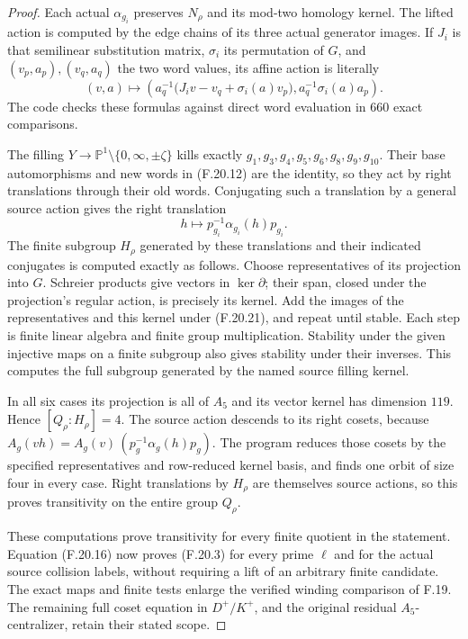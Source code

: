 \begin{proof}
Each actual $\alpha_{g_i}$ preserves $N_\rho$
and its mod-two homology kernel.
The lifted action is computed by the edge
chains of its three actual generator images.
If $J_i$ is that semilinear substitution matrix,
$\sigma_i$ its permutation of $G$, and
$(v_p,a_p),(v_q,a_q)$ the two word values,
its affine action is literally
\[
 (v,a)\longmapsto
 \left(a_q^{-1}\bigl(J_i v-v_q+\sigma_i(a)v_p\bigr),
                         a_q^{-1}\sigma_i(a)a_p\right).
                                                               \tag{F.20.20}
\]
The code checks these formulas against direct
word evaluation in $660$ exact comparisons.

The filling $Y\to
\mathbb P^1\setminus\{0,\infty,\pm\zeta\}$
kills exactly $g_1,g_3,g_4,g_5,g_6,g_8,g_9,g_{10}$.
Their base automorphisms and new words in
(F.20.12) are the identity, so they act by
right translations through their old words.
Conjugating such a translation by a general
source action gives the right translation
\[
                         h\longmapsto
                  p_{g_i}^{-1}\alpha_{g_i}(h)p_{g_i}.
                                                               \tag{F.20.21}
\]
The finite subgroup $H_\rho$ generated by these
translations and their indicated conjugates is
computed exactly as follows. Choose representatives
of its projection into $G$. Schreier products
give vectors in $\ker\partial$; their span,
closed under the projection's regular action,
is precisely its kernel. Add the images of
the representatives and this kernel under
(F.20.21), and repeat until stable.
Each step is finite linear algebra and finite
group multiplication. Stability under the
given injective maps on a finite subgroup
also gives stability under their inverses.
This computes the full subgroup generated
by the named source filling kernel.

In all six cases its projection is all of
$A_5$ and its vector kernel has dimension
$119$. Hence $[Q_\rho:H_\rho]=4$.
The source action descends to its right
cosets, because
$A_g(vh)=A_g(v)\,
 (p_g^{-1}\alpha_g(h)p_g)$.
The program reduces those cosets by the
specified representatives and row-reduced
kernel basis, and finds one orbit of size
four in every case.
Right translations by $H_\rho$ are themselves
source actions, so this proves transitivity
on the entire group $Q_\rho$.

These computations prove transitivity for
every finite quotient in the statement.
Equation (F.20.16) now proves (F.20.3) for
every prime $\ell$ and for the actual
source collision labels, without requiring
a lift of an arbitrary finite candidate.
The exact maps and finite tests enlarge the
verified winding comparison of F.19.
The remaining full coset equation in
$D^+/K^+$, and the original residual
$A_5$-centralizer, retain their stated scope.
\end{proof}
